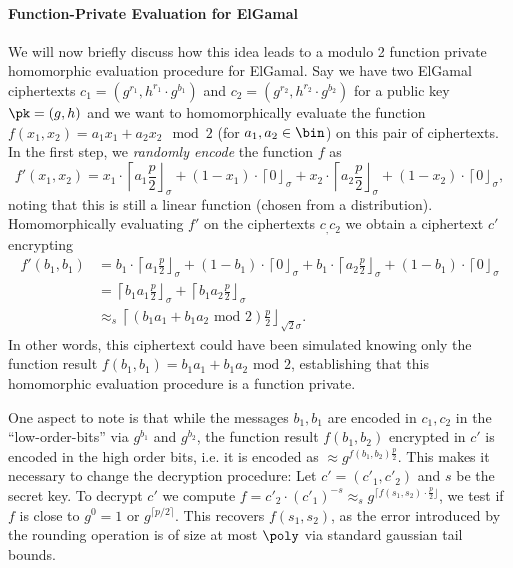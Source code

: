 \paragraph{Function-Private Evaluation for ElGamal}
We will now briefly discuss how this idea leads to a modulo 2 function private homomorphic evaluation procedure for ElGamal. Say we have two ElGamal ciphertexts $c_1 = (g^{r_1},h^{r_1} \cdot g^{b_1})$ and $c_2 = (g^{r_2},h^{r_2} \cdot g^{b_2})$ for a public key $\pk = (g,h)$ and we want to homomorphically evaluate the function $f(x_1,x_2) = a_1 x_1 + a_2 x_2 \mod 2$ (for $a_1,a_2 \in \bin$) on this pair of ciphertexts. In the first step, we \emph{randomly encode} the function $f$ as 
\[
f'(x_1,x_2) = x_1 \cdot \left\lceil a_1 \frac{p}{2}\right \rfloor_\sigma + (1-x_1) \cdot \left\lceil 0 \right\rfloor_\sigma + x_2 \cdot\left \lceil a_2 \frac{p}{2}\right\rfloor_\sigma + (1-x_2) \cdot\left \lceil 0 \right\rfloor_\sigma,
\]
noting that this is still a linear function (chosen from a distribution). Homomorphically evaluating $f'$ on the ciphertexts $c_,c_2$ we obtain a ciphertext $c'$ encrypting
\begin{align*}
f'(b_1,b_1) &= b_1 \cdot\left \lceil a_1 \frac{p}{2}\right \rfloor_\sigma + (1-b_1) \cdot\left \lceil 0 \right\rfloor_\sigma + b_1 \cdot\left \lceil a_2 \frac{p}{2} \right\rfloor_\sigma + (1-b_1) \cdot\left \lceil 0 \right\rfloor_\sigma\\
&=  \left\lceil b_1 a_1 \frac{p}{2} \right\rfloor_\sigma +  \left\lceil b_1 a_2 \frac{p}{2} \right\rfloor_\sigma\\
&\approx_s  \left\lceil (b_1 a_1 + b_1 a_2 \text{ mod } 2) \frac{p}{2} \right\rfloor_{\sqrt{2} \sigma}.
\end{align*}
In other words, this ciphertext could have been simulated knowing only the function result $f(b_1,b_1) = b_1 a_1 + b_1 a_2 \text{ mod } 2$, establishing that this homomorphic evaluation procedure is a function private.

One aspect to note is that while the messages $b_1,b_1$ are encoded in $c_1,c_2$ in the ``low-order-bits'' via $g^{b_1}$ and $g^{b_2}$, the function result $f(b_1,b_2)$ encrypted in $c'$ is encoded in the high order bits, i.e. it is encoded as $\approx g^{f(b_1,b_2) \frac{p}{2}}$. This makes it necessary to change the decryption procedure: Let $c' = (c'_1,c'_2)$ and $s$ be the secret key. To decrypt $c'$ we compute $f = c'_2 \cdot (c'_1)^{-s} \approx_s g^{\lceil f(s_1,s_2) \cdot \frac{p}{2} \rfloor}$, we test if $f$ is close to $g^0 = 1$ or $g^{\lceil p/2 \rceil}$. This recovers $f(s_1,s_2)$, as the error introduced by the rounding operation is of size at most $\poly$ via standard gaussian tail bounds.

